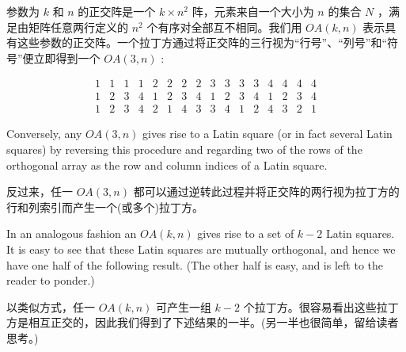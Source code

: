 \documentclass[10pt]{article}
\begin{document}
\begin{tcolorbox}\relax
参数为 \(k\) 和 \(n\) 的正交阵是一个 \(k \times  {n}^{2}\) 阵，元素来自一个大小为 \(n\) 的集合 \(N\) ，满足由矩阵任意两行定义的 \({n}^{2}\) 个有序对全部互不相同。我们用 \({OA}\left( {k,n}\right)\) 表示具有这些参数的正交阵。一个拉丁方通过将正交阵的三行视为“行号”、“列号”和“符号”便立即得到一个 \({OA}\left( {3,n}\right)\) :
\end{tcolorbox}

\[
\begin{array}{llllllllllllllll} 1 & 1 & 1 & 1 & 2 & 2 & 2 & 2 & 3 & 3 & 3 & 3 & 4 & 4 & 4 & 4 \\  1 & 2 & 3 & 4 & 1 & 2 & 3 & 4 & 1 & 2 & 3 & 4 & 1 & 2 & 3 & 4 \\  1 & 2 & 3 & 4 & 2 & 1 & 4 & 3 & 3 & 4 & 1 & 2 & 4 & 3 & 2 & 1 \end{array}
\]

Conversely, any \({OA}\left( {3,n}\right)\) gives rise to a Latin square (or in fact several Latin squares) by reversing this procedure and regarding two of the rows of the orthogonal array as the row and column indices of a Latin square.

\begin{tcolorbox}\relax
反过来，任一 \({OA}\left( {3,n}\right)\) 都可以通过逆转此过程并将正交阵的两行视为拉丁方的行和列索引而产生一个(或多个)拉丁方。
\end{tcolorbox}

In an analogous fashion an \({OA}\left( {k,n}\right)\) gives rise to a set of \(k - 2\) Latin squares. It is easy to see that these Latin squares are mutually orthogonal, and hence we have one half of the following result. (The other half is easy, and is left to the reader to ponder.)

\begin{tcolorbox}\relax
以类似方式，任一 \({OA}\left( {k,n}\right)\) 可产生一组 \(k - 2\) 个拉丁方。很容易看出这些拉丁方是相互正交的，因此我们得到了下述结果的一半。(另一半也很简单，留给读者思考。)
\end{tcolorbox}
\end{document}

